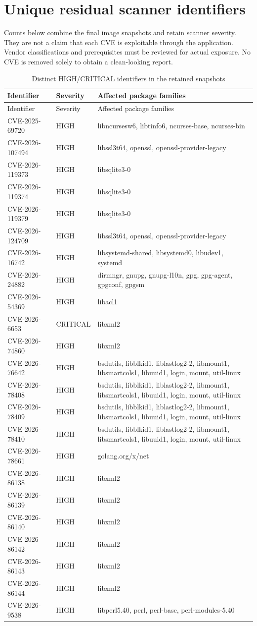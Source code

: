 \section{Unique residual scanner identifiers}
Counts below combine the final image snapshots and retain scanner severity. They are not a claim that each CVE is exploitable through the application. Vendor classifications and prerequisites must be reviewed for actual exposure. No CVE is removed solely to obtain a clean-looking report.
\begin{longtable}{p{.29\linewidth}p{.16\linewidth}p{.45\linewidth}}\caption{Distinct HIGH/CRITICAL identifiers in the retained snapshots}\\\toprule Identifier&Severity&Affected package families\\\midrule\endfirsthead\toprule Identifier&Severity&Affected package families\\\midrule\endhead
CVE-2025-69720&HIGH&libncursesw6, libtinfo6, ncurses-base, ncurses-bin\\
CVE-2026-107494&HIGH&libssl3t64, openssl, openssl-provider-legacy\\
CVE-2026-119373&HIGH&libsqlite3-0\\
CVE-2026-119374&HIGH&libsqlite3-0\\
CVE-2026-119379&HIGH&libsqlite3-0\\
CVE-2026-124709&HIGH&libssl3t64, openssl, openssl-provider-legacy\\
CVE-2026-16742&HIGH&libsystemd-shared, libsystemd0, libudev1, systemd\\
CVE-2026-24882&HIGH&dirmngr, gnupg, gnupg-l10n, gpg, gpg-agent, gpgconf, gpgsm\\
CVE-2026-54369&HIGH&libacl1\\
CVE-2026-6653&CRITICAL&libxml2\\
CVE-2026-74860&HIGH&libxml2\\
CVE-2026-76642&HIGH&bsdutils, libblkid1, liblastlog2-2, libmount1, libsmartcols1, libuuid1, login, mount, util-linux\\
CVE-2026-78408&HIGH&bsdutils, libblkid1, liblastlog2-2, libmount1, libsmartcols1, libuuid1, login, mount, util-linux\\
CVE-2026-78409&HIGH&bsdutils, libblkid1, liblastlog2-2, libmount1, libsmartcols1, libuuid1, login, mount, util-linux\\
CVE-2026-78410&HIGH&bsdutils, libblkid1, liblastlog2-2, libmount1, libsmartcols1, libuuid1, login, mount, util-linux\\
CVE-2026-78661&HIGH&golang.org/x/net\\
CVE-2026-86138&HIGH&libxml2\\
CVE-2026-86139&HIGH&libxml2\\
CVE-2026-86140&HIGH&libxml2\\
CVE-2026-86142&HIGH&libxml2\\
CVE-2026-86143&HIGH&libxml2\\
CVE-2026-86144&HIGH&libxml2\\
CVE-2026-9538&HIGH&libperl5.40, perl, perl-base, perl-modules-5.40\\
\bottomrule\end{longtable}
